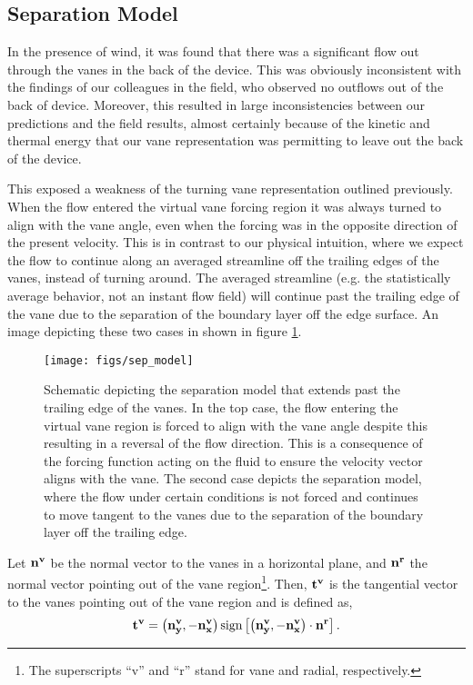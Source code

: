 \subsection{Separation Model}

In the presence of wind, it was found that there was a significant flow
out through the vanes in the back of the device. This was obviously
inconsistent with the findings of our colleagues in the field, who
observed no outflows out of the back of device. Moreover, this resulted
in large inconsistencies between our predictions and the field results,
almost certainly because of the kinetic and thermal energy that our vane
representation was permitting to leave out the back of the device.  

This exposed a weakness of the turning vane representation outlined
previously. When the flow entered the virtual vane forcing region it was
always turned to align with the vane angle, even when the forcing was in
the opposite direction of the present velocity.
This is in contrast to our physical intuition, where we
expect the flow to continue along an averaged streamline
off the trailing edges of the vanes, instead of turning around. 
The averaged streamline (e.g. the statistically average behavior, not
an instant flow field) will continue past the trailing edge of the vane
due to the separation of the boundary layer off the edge surface. An
image depicting these two cases in shown in figure \ref{fig:sep_model}.  

\begin{figure}[!htb]
  \begin{center}
    \texttt{[image: figs/sep\_model]}
    \caption{Schematic depicting the separation model that extends past
   the trailing edge of the vanes. In the top case, the flow entering
   the virtual vane region is forced to align with the vane angle despite
   this resulting in a reversal of the flow direction. This is a
   consequence of the forcing function acting on the fluid to ensure the
   velocity vector aligns with the vane. 
   The second case depicts the separation
   model, where the flow under certain conditions is not forced and
   continues to move tangent to the vanes due to 
   the separation of the boundary layer off the trailing edge.} 
    \label{fig:sep_model}
  \end{center}
\end{figure}

Let $\bf n^v$ be the normal vector to the vanes in a horizontal plane,
and $\bf n^r$ the normal vector pointing out of the vane
region\footnote{\normalsize The superscripts ``v'' and ``r'' stand for
vane and radial, respectively.}.  
Then, $\bf t^v$ is the tangential vector to the vanes pointing out of
the vane region and is defined as,
\begin{equation}
 \bf t^v = \left( {\bf n^v_y},{\bf -n_x^v} \right) \text{sign}\left[
	    \left( {\bf n^v_y},{\bf -n_x^v} \right) \cdot {\bf n^r} \right].
\end{equation}


